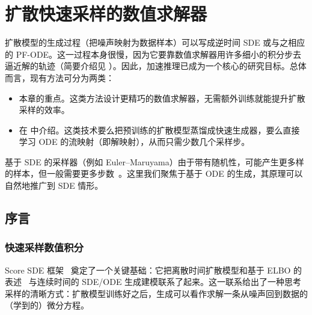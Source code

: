 \chapter{扩散快速采样的数值求解器}\label{ch:solvers}


扩散模型的生成过程（把噪声映射为数据样本）可以写成逆时间 SDE 或与之相应的 PF-ODE。这一过程本身很慢，因为它要靠数值求解器用许多细小的积分步去逼近解的轨迹（简要介绍见 ）。因此，加速推理已成为一个核心的研究目标。总体而言，现有方法可分为两类：
\begin{itemize}
    \item {} 本章的重点。这类方法设计更精巧的数值求解器，无需额外训练就能提升扩散采样的效率。
    \item {} 在  中介绍。这类技术要么把预训练的扩散模型蒸馏成快速生成器，要么直接学习 ODE 的流映射（即解映射），从而只需少数几个采样步。
\end{itemize}
基于 SDE 的采样器（例如 Euler--Maruyama）由于带有随机性，可能产生更多样的样本，但一般需要更多步数~\citep{xu2023restart}。这里我们聚焦于基于 ODE 的生成，其原理可以自然地推广到 SDE 情形。



\section{序言}\label{sec:prologue-solvers}
\subsection{快速采样数值积分}

Score SDE 框架~\citep{song2020score} 奠定了一个关键基础：它把离散时间扩散模型和基于 ELBO 的表述~\citep{sohl2015deep,ho2020denoising} 与连续时间的 SDE/ODE 生成建模联系了起来。这一联系给出了一种思考采样的清晰方式：扩散模型训练好之后，生成可以看作求解一条从噪声回到数据的（学到的）微分方程。


